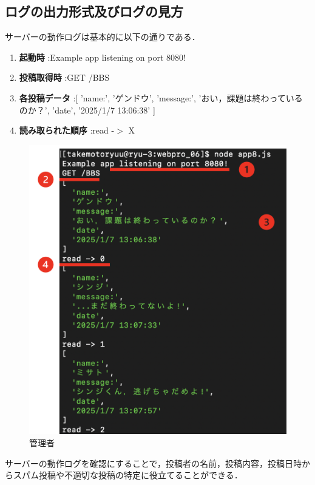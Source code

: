 \documentclass[uplatex,dvipdfmx]{jsarticle}
\begin{document}
\clearpage
\subsection{ログの出力形式及びログの見方}
サーバーの動作ログは基本的に以下の通りである．
\begin{enumerate}
    \item \textbf{起動時} :Example app listening on port 8080!
    \item \textbf{投稿取得時} :GET /BBS
    \item \textbf{各投稿データ} :[ 'name:', 'ゲンドウ', 'message:', 'おい，課題は終わっているのか？', 'date', '2025/1/7 13:06:38' ]
    \item \textbf{読み取られた順序} :read -$>$ X
\end{enumerate}

\begin{figure}[h]
    \centering
    \includegraphics[width=12cm]{管理者2.png}
    \caption{管理者}
    \label{fig:管理者}
\end{figure}

サーバーの動作ログを確認にすることで，投稿者の名前，投稿内容，投稿日時からスパム投稿や不適切な投稿の特定に役立てることができる．


\clearpage
\end{document}

